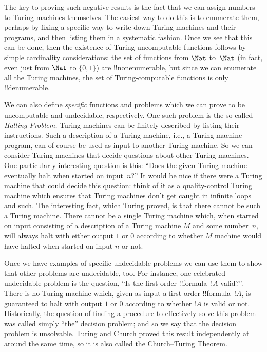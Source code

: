 \documentclass[../../../include/open-logic-section]{subfiles}
\begin{document}
The key to proving such negative results is the fact that we can
assign numbers to Turing machines themselves.  The easiest way to do
this is to enumerate them, perhaps by fixing a specific way to write
down Turing machines and their programs, and then listing them in a
systematic fashion.  Once we see that this can be done, then the
existence of Turing-uncomputable functions follows by simple
cardinality considerations: the set of functions from $\Nat$ to~$\Nat$ (in
fact, even just from $\Nat$ to $\{0, 1\}$) are !!{nonenumerable}, but
since we can enumerate all the Turing machines, the set of Turing-computable
functions is only !!{denumerable}.

We can also define \emph{specific} functions and problems which we can
prove to be uncomputable and undecidable, respectively.  One such
problem is the so-called \emph{Halting Problem.} Turing machines can
be finitely described by listing their instructions.  Such a
description of a Turing machine, i.e., a Turing machine program, can
of course be used as input to another Turing machine.  So we can
consider Turing machines that decide questions about other Turing
machines.  One particularly interesting question is this: ``Does the
given Turing machine eventually halt when started on input~$n$?''  It
would be nice if there were a Turing machine that could decide this
question: think of it as a quality-control Turing machine which
ensures that Turing machines don't get caught in infinite loops and
such.  The interesting fact, which Turing proved, is that there cannot
be such a Turing machine. There cannot be a single Turing machine
which, when started on input consisting of a description of a Turing
machine $M$ and some number~$n$, will always halt with either output
$1$ or $0$ according to whether $M$ machine would have halted when
started on input $n$ or not.

Once we have examples of specific undecidable problems we can use them
to show that other problems are undecidable, too.  For instance, one
celebrated undecidable problem is the question, ``Is the first-order
!!{formula}~$!A$ valid?''.  There is no Turing machine which, given as
input a first-order !!{formula}~$!A$, is guaranteed to halt with
output $1$ or $0$ according to whether $!A$ is valid or not.
Historically, the question of finding a procedure to effectively solve
this problem was called simply ``the'' decision problem; and so we say
that the decision problem is unsolvable.  Turing and Church proved this
result independently at around the same time, so it is also called the
Church--Turing Theorem.
\end{document}
